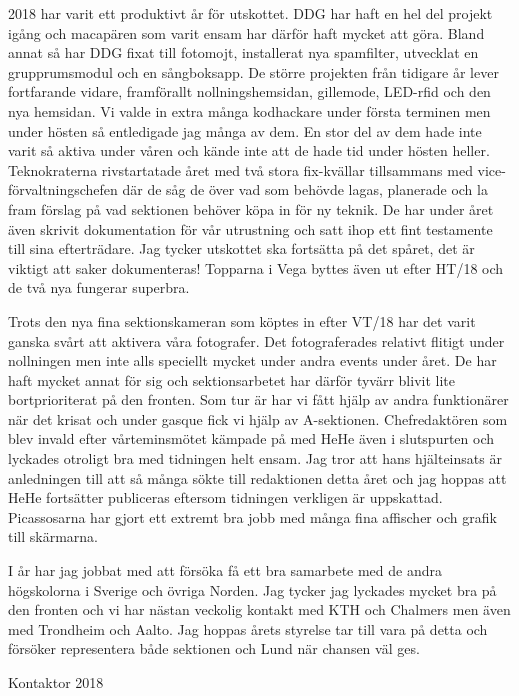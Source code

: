 \documentclass[../_main/handlingar.tex]{subfiles}
\begin{document}
2018 har varit ett produktivt år för utskottet. DDG har haft en hel del projekt igång och macapären som varit ensam har därför haft mycket att göra. Bland annat så har DDG fixat till fotomojt, installerat nya spamfilter, utvecklat en grupprumsmodul och en sångboksapp. De större projekten från tidigare år lever fortfarande vidare, framförallt nollningshemsidan, gillemode, LED-rfid och den nya hemsidan. Vi valde in extra många kodhackare under första terminen men under hösten så entledigade jag många av dem. En stor del av dem hade inte varit så aktiva under våren och kände inte att de hade tid under hösten heller. 
Teknokraterna rivstartatade året med två stora fix-kvällar tillsammans med vice-förvaltningschefen där de såg de över vad som behövde lagas, planerade och la fram förslag på vad sektionen behöver köpa in för ny teknik. De har under året även skrivit dokumentation för vår utrustning och satt ihop ett fint testamente till sina efterträdare. Jag tycker utskottet ska fortsätta på det spåret, det är viktigt att saker dokumenteras! Topparna i Vega byttes även ut efter HT/18 och de två nya fungerar superbra.  

Trots den nya fina sektionskameran som köptes in efter VT/18 har det varit ganska svårt att aktivera våra fotografer. Det fotograferades relativt flitigt under nollningen men inte alls speciellt mycket under andra events under året. De har haft mycket annat för sig och sektionsarbetet har därför tyvärr blivit lite bortprioriterat på den fronten. Som tur är har vi fått hjälp av andra funktionärer när det krisat och under gasque fick vi hjälp av A-sektionen. 
Chefredaktören som blev invald efter vårteminsmötet kämpade på med HeHe även i slutspurten och lyckades otroligt bra med tidningen helt ensam. Jag tror att hans hjälteinsats är anledningen till att så många sökte till redaktionen detta året och jag hoppas att HeHe fortsätter publiceras eftersom tidningen verkligen är uppskattad.  
Picassosarna har gjort ett extremt bra jobb med många fina affischer och grafik till skärmarna.

I år har jag jobbat med att försöka få ett bra samarbete med de andra högskolorna i Sverige och övriga Norden. Jag tycker jag lyckades mycket bra på den fronten och vi har nästan veckolig kontakt med KTH och Chalmers men även med Trondheim och Aalto. Jag hoppas årets styrelse tar till vara på detta och försöker representera både sektionen och Lund när chansen väl ges.

\begin{signatures}{1}
    \mvh
    \signature{Axel Voss}{Kontaktor 2018}
\end{signatures}
\end{document}
